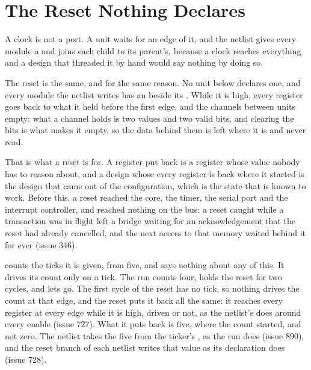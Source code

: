 \section{The Reset Nothing Declares}
\label{sec:x-reset}

A clock is not a port. A unit waits for an edge of it, and the
netlist gives every module a  and joins each child to its
parent's, because a clock reaches everything and a design that
threaded it by hand would say nothing by doing so.

The reset is the same, and for the same reason. No unit below
declares one, and every module the netlist writes has an 
beside its . While it is high, every register goes back to
what it held before the first edge, and the channels between units
empty: what a channel holds is two values and two valid bits, and
clearing the bits is what makes it empty, so the data behind them is
left where it is and never read.

That is what a reset is for. A register put back is a register whose
value nobody has to reason about, and a design whose every register
is back where it started is the design that came out of the
configuration, which is the state that is known to work. Before this,
a reset reached the core, the timer, the serial port and the
interrupt controller, and reached nothing on the bus: a reset caught
while a transaction was in flight left a bridge waiting for an
acknowledgement that the reset had already cancelled, and the next
access to that memory waited behind it for ever (issue 346).

 counts the ticks it is given, from five, and says
nothing about any of this. It drives its count only on a tick. The run counts four,
holds the reset for two cycles, and lets go. The first cycle of the
reset has no tick, so nothing drives the count at that edge, and the
reset puts it back all the same: it reaches every register at every
edge while it is high, driven or not, as the netlist's 
does around every enable (issue 727). What it puts back is five,
where the count started, and not zero. The netlist takes the five
from the ticker's , as the run does (issue 890), and the
reset branch of each netlist writes that value as its declaration
does (issue 728).



